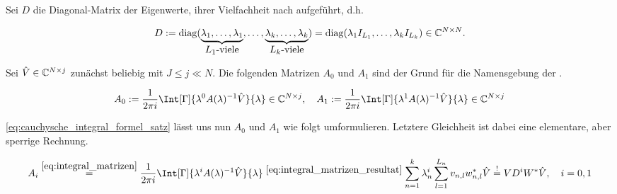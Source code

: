Sei $D$ die Diagonal-Matrix der Eigenwerte, ihrer Vielfachheit nach aufgeführt, d.h.

\begin{align} \label{eq:diagonal_matrix}
    D
    :=
    \operatorname{diag}
    (
        \underbrace
        {
            \lambda_1, \dots, \lambda_1
        }_{
            \displaystyle
            \text{$L_1$-viele}
        },
        \dots,
        \underbrace
        {
            \lambda_k, \dots, \lambda_k
        }_{
            \displaystyle
            \text{$L_k$-viele}
        }
    )
    =
    \operatorname{diag}(\lambda_1 I_{L_1}, \dots, \lambda_k I_{L_k})
    \in
    \mathbb{C}^{N \times N}.
\end{align}

Sei $\hat V \in \mathbb{C}^{N \times j}$ zunächst beliebig mit $J \leq j \ll N$.
Die folgenden Matrizen $A_0$ und $A_1$ sind der Grund für die Namensgebung der .

\begin{align} \label{eq:integral_matrizen}
    A_0 := \frac{1}{2 \pi i} \Int[\Gamma]{\lambda^0 A(\lambda)^{-1} \hat V}{\lambda} \in \C^{N \times j},
    \quad
    A_1 := \frac{1}{2 \pi i} \Int[\Gamma]{\lambda^1 A(\lambda)^{-1} \hat V}{\lambda} \in \C^{N \times j}
\end{align}

\eqref{eq:cauchysche_integral_formel_satz} lässt uns nun $A_0$ und $A_1$ wie folgt umformulieren.
Letztere Gleichheit ist dabei eine elementare, aber sperrige Rechnung.

\begin{align} \label{eq:integral_matrizen_resultat_compact}
    A_i
    \stackrel
    {
        \eqref{eq:integral_matrizen}
    }{=}
    \frac{1}{2 \pi i}
    \Int[\Gamma]
    {
        \lambda^i
        A(\lambda)^{-1}
        \hat V
    }{\lambda}
    \stackrel
    {
        \eqref{eq:integral_matrizen_resultat}
    }{}
    \sum_{n=1}^k
        \lambda_n^i
        \sum_{l=1}^{L_n}
            v_{n, l} w_{n, l}^\ast
    \hat V
    \stackrel{!}{=}
    V D^i W^\ast \hat V,
    \quad
    i = 0, 1
\end{align}
